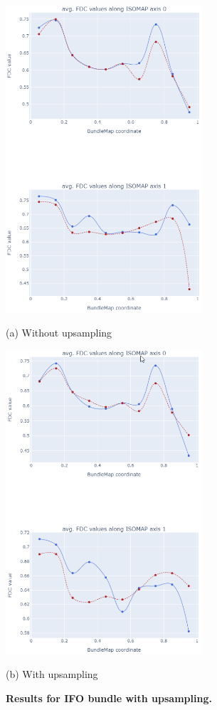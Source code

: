 \documentclass[thesis.tex]{subfiles}
\begin{document}
\begin{figure}[tbh!]
	\begin{minipage}[b]{0.49\linewidth}
		\centering
		\centerline{\includegraphics[width=7.3cm]{thesis_radomskyi/images/first-ifo-no-ups.png}}
		\centerline{(a) Without upsampling}\medskip
	\end{minipage}
	\hfill
	\begin{minipage}[b]{0.49\linewidth}
		\centering
		\centerline{\includegraphics[width=7.3cm]{thesis_radomskyi/images/first-ifo-with-ups.png}}
		\centerline{(b) With upsampling}\medskip
	\end{minipage}
	\caption{\textbf{Results for IFO bundle with upsampling.}}
  \label{fig:first-ifo}
\end{figure}
\end{document}

